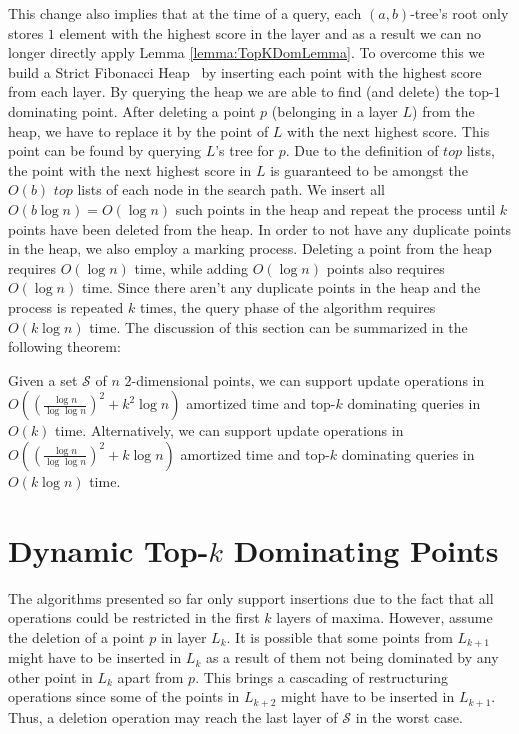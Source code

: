 \documentclass{llncs}
\begin{document}
This change also implies that at the time of a query, each $(a,b)$-tree's root only stores $1$ element with the highest score in the layer and as a result we can no longer directly apply Lemma \ref{lemma:TopKDomLemma}. To overcome this we build a Strict Fibonacci Heap~\cite{BrodalLT12} by inserting each point with the highest score from each layer. By querying the heap we are able to find (and delete) the top-$1$ dominating point. After deleting a point $p$ (belonging in a layer $L$) from the heap, we have to replace it by the point of $L$ with the next highest score. This point can be found by querying $L$'s tree for $p$. Due to the definition of $top$ lists, the point with the next highest score in $L$ is guaranteed to be amongst the $O(b)$ $top$ lists of each node in the search path. We insert all $O(b\log n)=O(\log n)$ such points in the heap and repeat the process until $k$ points have been deleted from the heap. In order to not have any duplicate points in the heap, we also employ a marking process. Deleting a point from the heap requires $O(\log n)$ time, while adding $O(\log n)$ points also requires $O(\log n)$ time. Since there aren't any duplicate points in the heap and the process is repeated $k$ times, the query phase of the algorithm requires $O(k\log n)$ time. The discussion of this section can be summarized in the following theorem:

\begin{theorem} \label{thm:sd}
Given a set $\mathcal{S}$ of $n$ $2$-dimensional points, we can support update operations in $O((\frac{\log n}{\log\log n})^{2}+k^{2}\log n)$ amortized time and top-$k$ dominating queries in $O(k)$ time. Alternatively, we can support update operations in $O((\frac{\log n}{\log\log n})^{2}+k\log n)$ amortized time and top-$k$ dominating queries in $O(k\log n)$ time.
\end{theorem}



\section{Dynamic Top-$k$ Dominating Points} \label{section:DynamicTopKDom}

The algorithms presented so far only support insertions due to the fact that all operations could be restricted in the first $k$ layers of maxima. However, assume the deletion of a point $p$ in layer $L_k$. It is possible that some points from $L_{k+1}$ might have to be inserted in $L_k$ as a result of them not being dominated by any other point in $L_k$ apart from $p$. This brings a cascading of restructuring operations since some of the points in $L_{k+2}$ might have to be inserted in $L_{k+1}$. Thus, a deletion operation may reach the last layer of $\mathcal{S}$ in the worst case.
\end{document}
